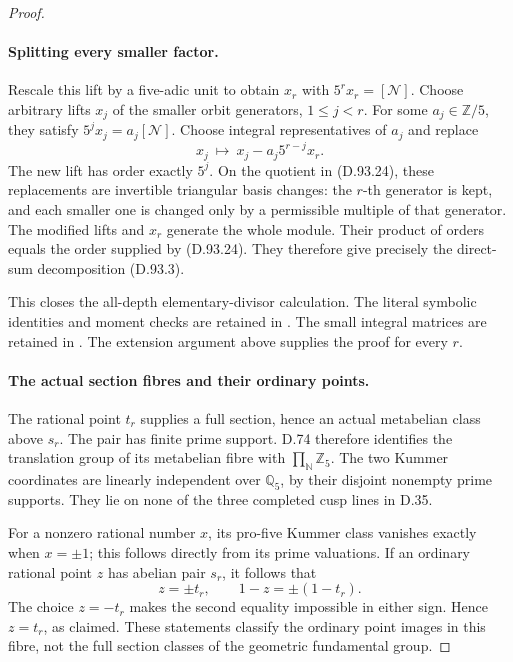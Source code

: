 \begin{proof}
\paragraph{Splitting every smaller factor.}
Rescale this lift by a five-adic unit to obtain \(x_r\)
with \(5^r x_r=[\mathcal N]\). Choose arbitrary lifts
\(x_j\) of the smaller orbit generators, \(1\le j<r\).
For some \(a_j\in\mathbb Z/5\), they satisfy
\(5^jx_j=a_j[\mathcal N]\).
Choose integral representatives of \(a_j\) and replace
\[
                     x_j\ \longmapsto\
                     x_j-a_j5^{r-j}x_r .
 \]
The new lift has order exactly \(5^j\). On the quotient
in (D.93.24), these replacements are invertible triangular
basis changes: the \(r\)-th generator is kept, and each
smaller one is changed only by a permissible multiple of
that generator. The modified lifts and \(x_r\) generate
the whole module. Their product of orders equals the
order supplied by (D.93.24). They therefore give precisely
the direct-sum decomposition (D.93.3).

This closes the all-depth elementary-divisor calculation.
The literal symbolic identities and moment checks are retained
in .
The small integral matrices are retained in
.
The extension argument above supplies the proof for every \(r\).

\paragraph{The actual section fibres and their ordinary points.}
The rational point \(t_r\) supplies a full section, hence an
actual metabelian class above \(s_r\). The pair has finite
prime support. D.74 therefore identifies the translation
group of its metabelian fibre with
\(\prod_{\mathbb N}\mathbb Z_5\).
The two Kummer coordinates are linearly independent over
\(\mathbb Q_5\), by their disjoint nonempty prime supports.
They lie on none of the three completed cusp lines in D.35.

For a nonzero rational number \(x\), its pro-five Kummer
class vanishes exactly when \(x=\pm1\); this follows directly
from its prime valuations. If an ordinary rational point
\(z\) has abelian pair \(s_r\), it follows that
\[
                  z=\pm t_r,\qquad
                  1-z=\pm(1-t_r).
 \]
The choice \(z=-t_r\) makes the second equality impossible
in either sign. Hence \(z=t_r\), as claimed. These statements
classify the ordinary point images in this fibre, not the
full section classes of the geometric fundamental group.
\end{proof}
